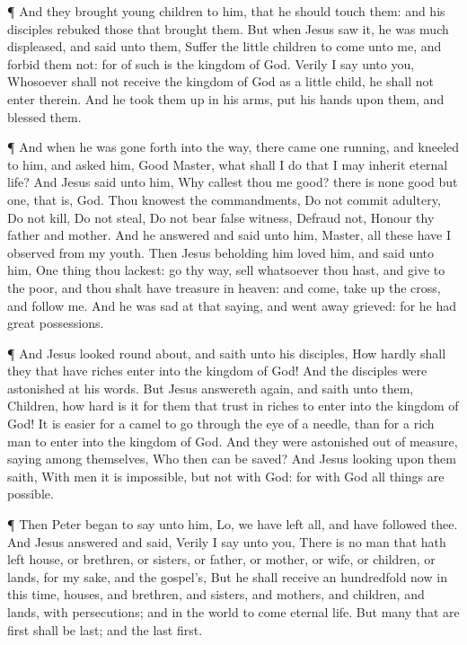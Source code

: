  ¶ And they brought young children to him, that he should
touch them: and his disciples rebuked those that brought them.
 But when Jesus saw it, he was much displeased, and said
unto them, Suffer the little children to come unto me, and forbid them
not: for of such is the kingdom of God.  Verily I say unto
you, Whosoever shall not receive the kingdom of God as a little child,
he shall not enter therein.  And he took them up in his
arms, put his hands upon them, and blessed them.

 ¶ And when he was gone forth into the way, there came one
running, and kneeled to him, and asked him, Good Master, what shall I do
that I may inherit eternal life?  And Jesus said unto him,
Why callest thou me good? there is none good but one, that is, God.
 Thou knowest the commandments, Do not commit adultery, Do
not kill, Do not steal, Do not bear false witness, Defraud not, Honour
thy father and mother.  And he answered and said unto him,
Master, all these have I observed from my youth.  Then
Jesus beholding him loved him, and said unto him, One thing thou
lackest: go thy way, sell whatsoever thou hast, and give to the poor,
and thou shalt have treasure in heaven: and come, take up the cross, and
follow me.  And he was sad at that saying, and went away
grieved: for he had great possessions.

 ¶ And Jesus looked round about, and saith unto his
disciples, How hardly shall they that have riches enter into the kingdom
of God!  And the disciples were astonished at his words.
But Jesus answereth again, and saith unto them, Children, how hard is it
for them that trust in riches to enter into the kingdom of God!
 It is easier for a camel to go through the eye of a
needle, than for a rich man to enter into the kingdom of God.
 And they were astonished out of measure, saying among
themselves, Who then can be saved?  And Jesus looking upon
them saith, With men it is impossible, but not with God: for with God
all things are possible.

 ¶ Then Peter began to say unto him, Lo, we have left all,
and have followed thee.  And Jesus answered and said,
Verily I say unto you, There is no man that hath left house, or
brethren, or sisters, or father, or mother, or wife, or children, or
lands, for my sake, and the gospel's,  But he shall receive
an hundredfold now in this time, houses, and brethren, and sisters, and
mothers, and children, and lands, with persecutions; and in the world to
come eternal life.  But many that are first shall be last;
and the last first.

